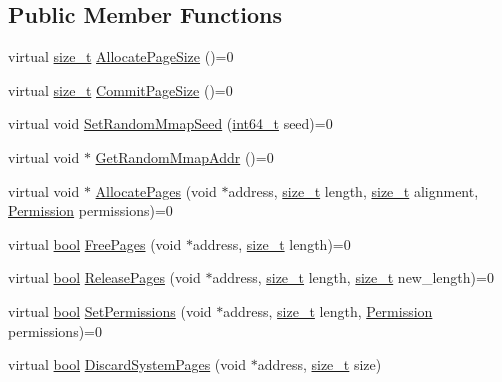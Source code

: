 \subsection*{Public Member Functions}
\begin{DoxyCompactItemize}
\item 
virtual \mbox{\hyperlink{classsize__t}{size\+\_\+t}} \mbox{\hyperlink{classv8_1_1PageAllocator_a92c2f6dbb3afa6c47dafd4c12ab4641f}{Allocate\+Page\+Size}} ()=0
\item 
virtual \mbox{\hyperlink{classsize__t}{size\+\_\+t}} \mbox{\hyperlink{classv8_1_1PageAllocator_ad817d87004151e3824997415f2dc57e9}{Commit\+Page\+Size}} ()=0
\item 
virtual void \mbox{\hyperlink{classv8_1_1PageAllocator_a9481a73527915fd200f6e1e9ed4b3eba}{Set\+Random\+Mmap\+Seed}} (\mbox{\hyperlink{classint64__t}{int64\+\_\+t}} seed)=0
\item 
virtual void $\ast$ \mbox{\hyperlink{classv8_1_1PageAllocator_a37f194f9c5fdbe5105476cbd1432418c}{Get\+Random\+Mmap\+Addr}} ()=0
\item 
virtual void $\ast$ \mbox{\hyperlink{classv8_1_1PageAllocator_ab3a25ddd2601701f80ee67c4bf017ef7}{Allocate\+Pages}} (void $\ast$address, \mbox{\hyperlink{classsize__t}{size\+\_\+t}} length, \mbox{\hyperlink{classsize__t}{size\+\_\+t}} alignment, \mbox{\hyperlink{classv8_1_1PageAllocator_a88f74b164fe97e053259f67a95758415}{Permission}} permissions)=0
\item 
virtual \mbox{\hyperlink{classbool}{bool}} \mbox{\hyperlink{classv8_1_1PageAllocator_abc2e3fdc768aba7d35ce0cf44f14586c}{Free\+Pages}} (void $\ast$address, \mbox{\hyperlink{classsize__t}{size\+\_\+t}} length)=0
\item 
virtual \mbox{\hyperlink{classbool}{bool}} \mbox{\hyperlink{classv8_1_1PageAllocator_a6eb6bd93c8880dd022a61a13c65f66c0}{Release\+Pages}} (void $\ast$address, \mbox{\hyperlink{classsize__t}{size\+\_\+t}} length, \mbox{\hyperlink{classsize__t}{size\+\_\+t}} new\+\_\+length)=0
\item 
virtual \mbox{\hyperlink{classbool}{bool}} \mbox{\hyperlink{classv8_1_1PageAllocator_aa3817d5bfaba9ec280a6cfb60e6adda0}{Set\+Permissions}} (void $\ast$address, \mbox{\hyperlink{classsize__t}{size\+\_\+t}} length, \mbox{\hyperlink{classv8_1_1PageAllocator_a88f74b164fe97e053259f67a95758415}{Permission}} permissions)=0
\item 
virtual \mbox{\hyperlink{classbool}{bool}} \mbox{\hyperlink{classv8_1_1PageAllocator_ad0de847c922e25f63d82494d997f441d}{Discard\+System\+Pages}} (void $\ast$address, \mbox{\hyperlink{classsize__t}{size\+\_\+t}} size)
\end{DoxyCompactItemize}


